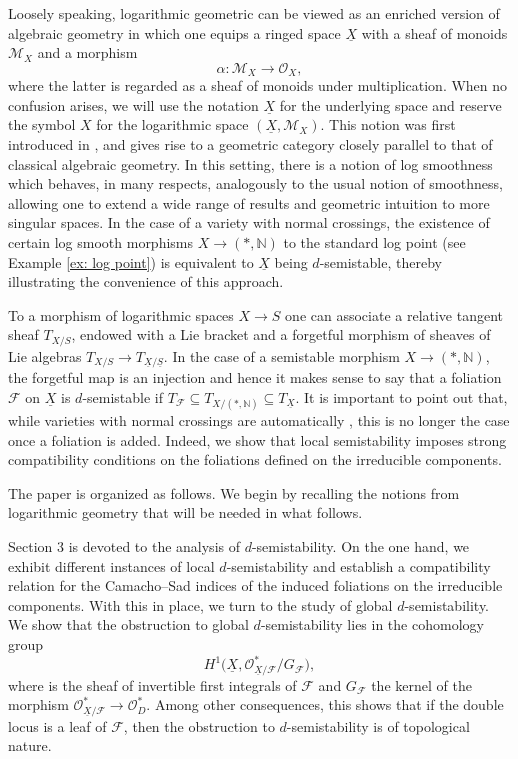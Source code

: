 \documentclass[reqno]{amsart}
\newcommand\N{\mathbb{N}}
\newcommand{\OO}{\mathcal{O}}
\newcommand{\F}{\mathscr{F}}
\newcommand{\M}{\mathcal{M}}
\theoremstyle{definition}
\theoremstyle{named}
\begin{document}
Loosely speaking, logarithmic geometric 
can be viewed as an enriched version of algebraic geometry in which one equips a ringed space $\underline{X}$ with a sheaf of monoids $\M_X$ and a morphism
$$ \alpha:\M_X\to \OO_X,$$
where the latter is regarded as a sheaf of monoids under multiplication. When no confusion arises, we will use the notation $\underline{X}$ for the underlying space and reserve the symbol $X$ for the logarithmic space $(\underline{X},\M_X)$. This notion was first introduced in \cite{kato1988logarithmic_str}, and gives rise to a geometric category closely parallel to that of classical algebraic geometry.
In this setting, there is a notion of log smoothness which behaves, in many respects, analogously to the usual notion of smoothness, allowing one to extend a wide range of results and geometric intuition to more singular spaces.
In the case of a variety with normal crossings, the existence of certain log smooth morphisms $X\to (\ast, \N)$ to the standard log point (see Example \ref{ex: log point}) is equivalent to $\underline{X}$ being $d$-semistable, thereby illustrating the convenience of this approach. 

To a morphism of logarithmic spaces $X\to S$ one can associate a relative tangent sheaf $T_{X/S}$, endowed with a Lie bracket and a forgetful morphism of sheaves of Lie algebras $T_{X/S}\to T_{\underline{X}/\underline{S}}$.
In the case of a semistable morphism $X\to (\ast,\N)$, the forgetful map is an injection and hence it makes sense to say that a foliation $\F$ on $\underline{X}$ is $d$-semistable if $T_{\F}\subseteq T_{X/(\ast,\N)}\subseteq T_{\underline{X}}$.
It is important to point out that, while varieties with normal crossings are automatically  \cite[Prop. 11.3]{kato1988logarithmic_str}, this is no longer the case once a foliation is added. Indeed, we show that local semistability imposes strong compatibility conditions on the foliations defined on the irreducible components. 


The paper is organized as follows. We begin by recalling the notions from logarithmic geometry that will be needed in what follows.

Section 3 is devoted to the analysis of $d$-semistability. On the one hand, we exhibit different instances of local $d$-semistability and establish a compatibility relation for the Camacho–Sad indices of the induced foliations on the irreducible components.
With this in place, we turn to the study of global $d$-semistability. We show that the obstruction to global $d$-semistability lies in the cohomology group
$$H^1\big(\underline{X},\OO^\ast_{\underline{X}/\F}/G_\F\big),$$
where \smash{$\OO^\ast_{\underline{X}/\F}$} is the sheaf of invertible first integrals of $\F$ and $G_\F$ the kernel of the morphism $\OO^\ast_{\underline{X}/\F}\to \OO_D^\ast$. Among other consequences, this shows that if the double locus is a leaf of $\F$, then the obstruction to $d$-semistability is of topological nature.
\end{document}
